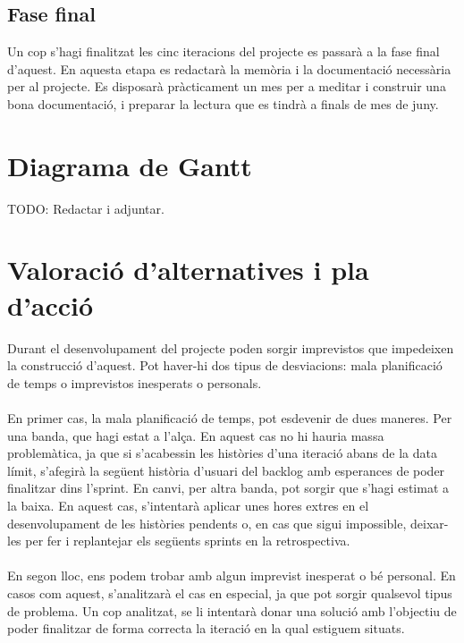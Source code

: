 \subsection{Fase final}

Un cop s’hagi finalitzat les cinc iteracions del projecte es passarà a la fase final d’aquest. En aquesta etapa es redactarà la memòria i la documentació necessària per al projecte. Es disposarà pràcticament un mes per a meditar i construir una bona documentació, i preparar la lectura que es tindrà a finals de mes de juny.


\section{Diagrama de Gantt}

TODO: Redactar i adjuntar.


\section{Valoració d'alternatives i pla d'acció}

Durant el desenvolupament del projecte poden sorgir imprevistos que impedeixen la construcció d'aquest. Pot haver-hi dos tipus de desviacions: mala planificació de temps o imprevistos inesperats o personals.
\\\\
En primer cas, la mala planificació de temps, pot esdevenir de dues maneres. Per una banda, que hagi estat a l’alça. En aquest cas no hi hauria massa problemàtica, ja que si s’acabessin les històries d’una iteració abans de la data límit, s’afegirà la següent història d’usuari del backlog amb esperances de poder finalitzar dins l’sprint. En canvi, per altra banda, pot sorgir que s’hagi estimat a la baixa. En aquest cas, s’intentarà aplicar unes hores extres en el desenvolupament de les històries pendents o, en cas que sigui impossible, deixar-les per fer i replantejar els següents sprints en la retrospectiva.
\\\\
En segon lloc, ens podem trobar amb algun imprevist inesperat o bé personal. En casos com aquest, s’analitzarà el cas en especial, ja que pot sorgir qualsevol tipus de problema. Un cop analitzat, se li intentarà donar una solució amb l’objectiu de poder finalitzar de forma correcta la iteració en la qual estiguem situats.